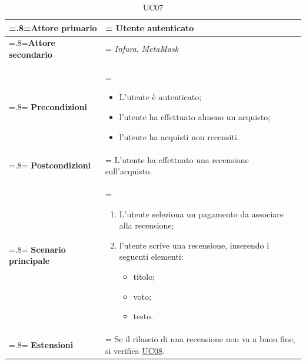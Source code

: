             \begin{table}[H]
                \centering
                \renewcommand{\arraystretch}{1.8}
                \renewcommand\tabularxcolumn[1]{m{#1}}
                \begin{tabularx}{0.9\textwidth}{
                    >{\hsize=.8\hsize\linewidth=\hsize}X
                    >{\hsize=1.2\hsize\linewidth=\hsize}X}
                    \hline
                    \textbf{Attore primario} & Utente autenticato \\
                    \hline
                    \textbf{Attore secondario} & \textit{Infura}, \textit{MetaMask} \\
                    \hline
                    \textbf{Precondizioni} &
                        \begin{itemize}
                            \item L'utente è autenticato;
                            \item l'utente ha effettuato almeno un acquisto;
                            \item l'utente ha acquisti non recensiti.
                        \end{itemize} \\
                    \hline
                    \textbf{Postcondizioni} & L'utente ha effettuato una recensione sull'acquisto. \\
                    \hline
                    \textbf{Scenario principale} &
                        \begin{enumerate}
                            \item L'utente seleziona un pagamento da associare alla recensione;
                            \item l'utente scrive una recensione, inserendo i seguenti elementi:
                            \begin{itemize}
                                \item titolo;
                                \item voto;
                                \item testo.
                            \end{itemize}
                        \end{enumerate} \\
                    \hline
                    \textbf{Estensioni} & Se il rilascio di una recensione non va a buon fine, si verifica \hyperref[UC08]{UC08}. \\
                    \hline
                \end{tabularx}
                \caption{UC07}
            \end{table}

